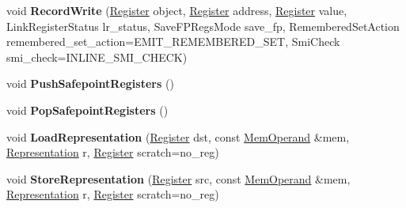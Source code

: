 \begin{DoxyCompactItemize}
\item 
\mbox{\label{classv8_1_1internal_1_1MacroAssembler_aafeb4e1da90d61d024029e1f75ca4490}} 
void {\bfseries Record\+Write} (\mbox{\hyperlink{classv8_1_1internal_1_1Register}{Register}} object, \mbox{\hyperlink{classv8_1_1internal_1_1Register}{Register}} address, \mbox{\hyperlink{classv8_1_1internal_1_1Register}{Register}} value, Link\+Register\+Status lr\+\_\+status, Save\+F\+P\+Regs\+Mode save\+\_\+fp, Remembered\+Set\+Action remembered\+\_\+set\+\_\+action=E\+M\+I\+T\+\_\+\+R\+E\+M\+E\+M\+B\+E\+R\+E\+D\+\_\+\+S\+ET, Smi\+Check smi\+\_\+check=I\+N\+L\+I\+N\+E\+\_\+\+S\+M\+I\+\_\+\+C\+H\+E\+CK)
\item 
\mbox{\label{classv8_1_1internal_1_1MacroAssembler_aca545d9193d7a468e285a5ba66fb6f19}} 
void {\bfseries Push\+Safepoint\+Registers} ()
\item 
\mbox{\label{classv8_1_1internal_1_1MacroAssembler_accf004371b050ef53eb57724f4d8d8b1}} 
void {\bfseries Pop\+Safepoint\+Registers} ()
\item 
\mbox{\label{classv8_1_1internal_1_1MacroAssembler_a95f2d2ea02d4c9b5c615a36b74ebeea2}} 
void {\bfseries Load\+Representation} (\mbox{\hyperlink{classv8_1_1internal_1_1Register}{Register}} dst, const \mbox{\hyperlink{classv8_1_1internal_1_1MemOperand}{Mem\+Operand}} \&mem, \mbox{\hyperlink{classv8_1_1internal_1_1Representation}{Representation}} r, \mbox{\hyperlink{classv8_1_1internal_1_1Register}{Register}} scratch=no\+\_\+reg)
\item 
\mbox{\label{classv8_1_1internal_1_1MacroAssembler_a40cd798ddca8342df758201ec7d2802a}} 
void {\bfseries Store\+Representation} (\mbox{\hyperlink{classv8_1_1internal_1_1Register}{Register}} src, const \mbox{\hyperlink{classv8_1_1internal_1_1MemOperand}{Mem\+Operand}} \&mem, \mbox{\hyperlink{classv8_1_1internal_1_1Representation}{Representation}} r, \mbox{\hyperlink{classv8_1_1internal_1_1Register}{Register}} scratch=no\+\_\+reg)
\item 
\mbox{\label{classv8_1_1internal_1_1MacroAssembler_ab454c229ecab5061af905b7d5959c919}} 

\end{DoxyCompactItemize}
